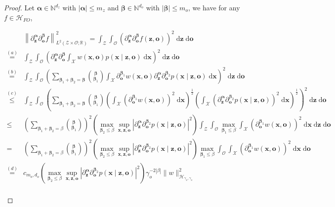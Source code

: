 \documentclass[11pt]{article}
\newcommand{\bx}{\mathbf x}
\newcommand{\bz}{\mathbf z}
\newcommand{\bo}{\mathbf o}
\newcommand{\calZ}{\mathcal{Z}}
\newcommand{\calH}{\mathcal{H}}
\newcommand{\calO}{\mathcal{O}}
\newcommand{\calX}{\mathcal{X}}
\newcommand{\R}{\mathbb{R}}
\newcommand{\0}{\mathbf{0}}
\newcommand{\balpha}{\boldsymbol\alpha}
\newcommand{\bbeta}{\boldsymbol\beta}
\begin{document}
\begin{appendix}
\begin{proof}
Let $\balpha \in \mathbb{N}^{d_z}$ with $|\balpha| \leq m_z$ and $\bbeta\in \mathbb{N}^{d_o}$ with $|\bbeta| \leq m_o$, we have for any $f\in\calH_{FO}$,
\begin{small}
\begin{align*}
    &\left\|\partial^{\balpha}_{\bz}\partial^{\bbeta}_{\bo}f\right\|^2_{L^2(\calZ\times\calO;\R)} = \int_{\calZ}\int_{\calO} \left(\partial_{\bz}^{\balpha}\partial^{\bbeta}_{\bo}f(\bz,\bo)\right)^2\;\mathrm{d}\bz\;\mathrm{d}\bo\\
    \stackrel{(a)}{=}& \int_{\calZ}\int_{\calO}\left(\partial_{\bz}^{\balpha}\partial_{\bo}^{\bbeta}\int_{\calX} w(\bx,\bo) p(\bx\mid \bz,\bo)\;\mathrm{d}\bx\right)^2\;\mathrm{d}\bz\;\mathrm{d}\bo\\
    \stackrel{(b)}{=}& \int_{\calZ}\int_{\calO}\left(\sum_{\bbeta_1+\bbeta_2 = \bbeta}\binom{\bbeta}{\bbeta_1}\int_{\calX} \partial^{\bbeta_1}_{\bo} w(\bx,\bo) \partial^{\balpha}_{\bz}\partial^{\bbeta_2}_{\bo}p(\bx\mid \bz,\bo)\;\mathrm{d}\bx\right)^2\;\mathrm{d}\bz\;\mathrm{d}\bo\\
    \stackrel{(c)}{\leq}& \int_{\calZ}\int_{\calO}\left(\sum_{\bbeta_1+\bbeta_2 = \bbeta}\binom{\bbeta}{\bbeta_1}\left(\int_{\calX} \left(\partial^{\bbeta_1}_{\bo} w(\bx,\bo) \right)^2\;\mathrm{d}\bx\right)^{\frac{1}{2}} \left(\int_{\calX} \left(\partial^{\balpha}_{\bz}\partial^{\bbeta_2}_{\bo}p(\bx\mid \bz,\bo)\right)^2 \;\mathrm{d}\bx\right)^{\frac{1}{2}}\right)^2\;\mathrm{d}\bz\;\mathrm{d}\bo\\
    \leq & \left(\sum_{\bbeta_1+\bbeta_2 = \beta}\binom{\bbeta}{\bbeta_1}\right)^2 \left(\max_{\bbeta_2\leq \beta}\sup_{\bx,\bz,\bo}\left|\partial^{\balpha}_{\bz}\partial^{\bbeta_2}_{\bo}p(\bx\mid \bz,\bo)\right|^2\right) \int_{\calZ}\int_{\calO} \max_{\bbeta_1\leq \beta} \int_{\calX}\left(\partial^{\bbeta_1}_{\bo}w(\bx,\bo)\right)^2\;\mathrm{d}\bx \;\mathrm{d}\bz\;\mathrm{d}\bo\\
    =& \left(\sum_{\bbeta_1+\bbeta_2 = \beta}\binom{\bbeta}{\bbeta_1}\right)^2 \left(\max_{\bbeta_2\leq \beta}\sup_{\bx,\bz,\bo}\left|\partial^{\balpha}_{\bz}\partial^{\bbeta_2}_{\bo}p(\bx\mid \bz,\bo)\right|^2\right) \max_{\bbeta_1\leq \beta} \int_{\calO}\int_{\calX}\left(\partial^{\bbeta_1}_{\bo}w(\bx,\bo)\right)^2\;\mathrm{d}\bx \;\mathrm{d}\bo\\
    \stackrel{(d)}{=}& c_{m_o, d_o}\left(\max_{\bbeta_2\leq \beta}\sup_{\bx,\bz,\bo}\left|\partial^{\balpha}_{\bz}\partial^{\bbeta_2}_{\bo}p(\bx\mid \bz,\bo)\right|^2\right)  \gamma_o^{-2|\beta|} \|w\|_{\calH_{\gamma_x,\gamma_o}}^2\\

\end{align*}
\end{small}
\end{proof}
\end{appendix}
\end{document}
